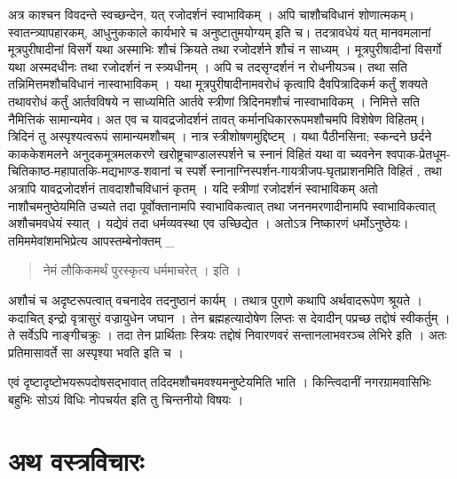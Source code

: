 अत्र काश्चन विवदन्ते स्वच्छन्देन, यत् रजोदर्शनं स्वाभाविकम् । अपि चाशौचविधानं शोणात्मकम्। स्वातन्त्र्यापहारकम्, आधुनुककाले कार्यभारे च अनुष्टातुमयोग्यम् इति च। तदत्रावधेयं यत् मानवमलानां मूत्रपुरीषादीनां विसर्गे यथा अस्माभिः शौचं क्रियते तथा रजोदर्शने शौचं न साध्यम् । मूत्रपुरीषादीनां विसर्गो यथा अस्मदधीनः तथा रजोदर्शनं न स्त्र्यधीनम् । अपि च तदसृग्दर्शनं न रोधनीयञ्च। तथा सति तन्निमित्तमशौचविधानं नास्वाभाविकम् । यथा मूत्रपुरीषादीनामवरोधं कृत्वापि दैवपित्रादिकर्म कर्तुं शक्यते तथावरोधं कर्तुं आर्तवविषये न साध्यमिति आर्तवे स्त्रीणां त्रिदिनमशौचं नास्वाभाविकम् । निमित्ते सति नैमित्तिकं सामान्यमेव। अत एव च यावद्रजोदर्शनं तावत् कर्मानधिकाररूपमशौचमपि विशेषेण विहितम्। त्रिदिनं तु अस्पृश्यत्वरूपं सामान्यमशौचम् । नात्र स्त्रीशोषणमुद्दिष्टम् । यथा पैठीनसिना; स्कन्दने छर्दने काककेशमलने अनुदकमूत्रमलकरणे खरोष्ट्रचाण्डालस्पर्शने च स्नानं विहितं यथा वा च्यवनेन श्वपाक-प्रेतधूम-चितिकाष्ठ-महापातकि-मद्यभाण्ड-शवानां च स्पर्शे स्नानाग्निस्पर्शन-गायत्रीजप-घृतप्राशनमिति विहितं , तथा अत्रापि यावद्रजोदर्शनं तावदाशौचविधानं कृतम् । यदि स्त्रीणां रजोदर्शनं स्वाभाविकम् अतो नाशौचमनुष्ठेयमिति उच्यते तदा पूर्वोक्तानामपि स्वाभाविकत्वात् तथा जननमरणादीनामपि स्वाभाविकत्वात् अशौचमवधेयं स्यात् । यद्येवं तदा धर्मव्यवस्था एव उच्छिद्येत । अतोऽत्र निष्कारणं धर्मोऽनुष्ठेयः। तमिममेवांशमभिप्रेत्य आपस्तम्बेनोक्तम्  _
\begin{verse}
नेमं लौकिकमर्थं पुरस्कृत्य धर्ममाचरेत् । इति । 
\end{verse}
अशौचं च अदृष्टरूपत्वात् वचनादेव तदनुष्ठानं कार्यम् । तथात्र पुराणे कथापि अर्थवादरूपेण श्रूयते । कदाचित् इन्द्रो वृत्रासुरं वज्रायुधेन जघान । तेन ब्रह्महत्यादोषेण लिप्तः स देवादीन् पप्रच्छ तद्दोषं स्वीकर्तुम् । ते सर्वेऽपि नाङ्गीचक्रुः । तदा तेन प्रार्थिताः स्त्रियः तद्दोषं निवारणवरं सन्तानलाभवरञ्च लेभिरे इति । अतः प्रतिमासावर्ते सा अस्पृश्या भवति इति च । 

एवं दृष्टादृष्टोभयरूपदोषसद्भावात् तदिदमशौचमवश्यमनुष्टेयमिति भाति । किन्त्विदानीं नगरग्रामवासिभिः बहुभिः सोऽयं विधिः नोपचर्यत इति तु चिन्तनीयो विषयः ।

\section*{अथ वस्त्रविचारः}

